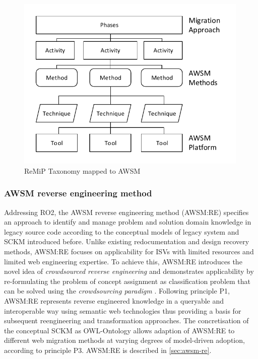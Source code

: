 \begin{figure}
\hypertarget{fig:methods-techniques-tools}{%
\centering
\includegraphics[width=0.99\textwidth]{../figures/remip-methods-techniques-tools.pdf}
\caption{ReMiP Taxonomy \autocite[adapted from][]{Sneed2010SoftwareMigration} mapped to AWSM}\label{fig:methods-techniques-tools}
}
\end{figure}

\hypertarget{awsm-reverse-engineering-method}{%
\subsubsection{AWSM reverse engineering method}\label{awsm-reverse-engineering-method}}

Addressing RO2, the AWSM reverse engineering method (AWSM:RE) specifies an approach to identify and manage problem and solution domain knowledge in legacy source code according to the conceptual models of legacy system and SCKM introduced before.
Unlike existing redocumentation and design recovery methods, AWSM:RE focuses on applicability for ISVs with limited resources and limited web engineering expertise.
To achieve this, AWSM:RE introduces the novel idea of \emph{crowdsourced reverse engineering} \autocite{Heil2018CSRE} and demonstrates applicability by re-formulating the problem of concept assignment \autocite{Biggerstaff1994ConceptAssignmentJournal} as classification problem that can be solved using the \emph{crowdsourcing paradigm} \autocite{Howe2006}.
Following principle P1, AWSM:RE represents reverse engineered knowledge in a queryable and interoperable way using semantic web technologies thus providing a basis for subsequent reengineering and transformation approaches.
The concretisation of the conceptual SCKM as OWL-Ontology allows adaption of AWSM:RE to different web migration methods at varying degrees of model-driven adoption, according to principle P3.
AWSM:RE is described in \cref{sec:awsm-re}.

